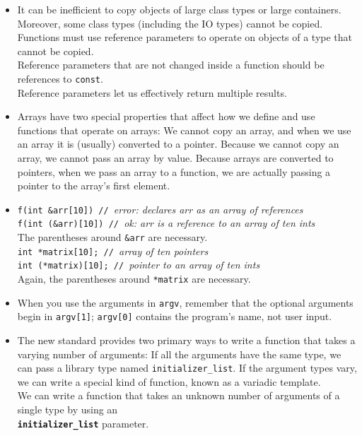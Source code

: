 \begin{itemize}
\item
It can be inefficient to copy objects of large class types or large containers. Moreover, some class types (including the IO types) cannot be copied. Functions must use reference parameters to operate on objects of a type that cannot be copied.\\
Reference parameters that are not changed inside a function should be references to \texttt{const}.\\
Reference parameters let us effectively return multiple results.

\item
Arrays have two special properties that affect how we define and use functions that operate on arrays: We cannot copy an array, and when we use an array it is (usually) converted to a pointer. Because we cannot copy an array, we cannot pass an array by value. Because arrays are converted to pointers, when we pass an array to a function, we are actually passing a pointer to the array's first element.

\item
\hspace*{1em}\texttt{f(int \&arr[10]) // }\textit{error: declares arr as an array of references}\\
\hspace*{1em}\texttt{f(int (\&arr)[10]) // }\textit{ok: arr is a reference to an array of ten ints}\\
The parentheses around \texttt{\&arr} are necessary.\\
\hspace*{1em}\texttt{int *matrix[10]; // }\textit{array of ten pointers}\\
\hspace*{1em}\texttt{int (*matrix)[10]; // }\textit{pointer to an array of ten ints}\\
Again, the parentheses around \texttt{*matrix} are necessary.

\item
When you use the arguments in \texttt{argv}, remember that the optional arguments begin in \texttt{argv[1]}; \texttt{argv[0]} contains the program's name, not user input.

\item
The new standard provides two primary ways to write a function that takes a varying number of arguments: If all the arguments have the same type, we can pass a library type named \texttt{initializer\_list}. If the argument types vary, we can write a special kind of function, known as a variadic template.\\
We can write a function that takes an unknown number of arguments of a single type by using an\\
\textbf{\texttt{initializer\_list}} parameter.


\end{itemize}

